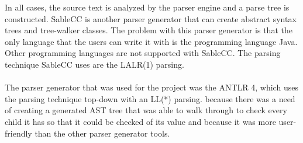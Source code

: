 In all cases, the source text is analyzed by the parser engine and a parse tree is constructed.
SableCC is another parser generator that can create abstract syntax trees and tree-walker classes. The problem with this parser generator is that the only language that the users can write it with is the programming language Java. Other programming languages are not supported with SableCC. The parsing technique SableCC uses are the LALR(1) parsing\cite{SableCC}.\\
\\
The parser generator that was used for the project was the ANTLR 4, which uses the parsing technique top-down with an LL(*) parsing. because there was a need of creating a generated AST tree that was able to walk through to check every child it has so that it could be checked of its value and because it was more user-friendly than the other parser generator tools. 

